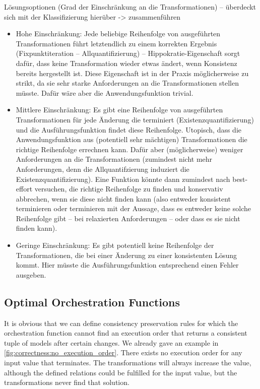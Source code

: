Lösungsoptionen (Grad der Einschränkung an die Transformationen) --  überdeckt sich mit der Klassifizierung hierüber -> zusammenführen
\begin{itemize}
    \item Hohe Einschränkung: Jede beliebige Reihenfolge von ausgeführten Transformationen führt letztendlich zu einem korrekten Ergebnis (Fixpunktiteration -- Allquantifizierung) -- Hippokratie-Eigenschaft sorgt dafür, dass keine Transformation wieder etwas ändert, wenn Konsistenz bereits hergestellt ist.
    Diese Eigenschaft ist in der Praxis möglicherweise zu strikt, da sie sehr starke Anforderungen an die Transformationen stellen müsste. Dafür wäre aber die Anwendungsfunktion trivial.
    \item Mittlere Einschränkung: Es gibt eine Reihenfolge von ausgeführten Transformationen für jede Änderung die terminiert (Existenzquantifizierung) und die Ausführungsfunktion findet diese Reihenfolge.
    Utopisch, dass die Anwendungsfunktion aus (potentiell sehr mächtigen) Transformationen die richtige Reihenfolge errechnen kann. Dafür aber (möglicherweise) weniger Anforderungen an die Transformationen (zumindest nicht mehr Anforderungen, denn die Allquantifzierung induziert die Existenzquantifizierung). Eine Funktion könnte dann zumindest nach best-effort versuchen, die richtige Reihenfolge zu finden und konservativ abbrechen, wenn sie diese nicht finden kann (also entweder konsistent terminieren oder terminieren mit der Aussage, dass es entweder keine solche Reihenfolge gibt -- bei relaxierten Anforderungen -- oder dass es sie nicht finden kann).  
    \item Geringe Einschränkung: Es gibt potentiell keine Reihenfolge der Transformationen, die bei einer Änderung zu einer konsistenten Lösung kommt. Hier müsste die Ausführungsfunktion entsprechend einen Fehler ausgeben.
\end{itemize}


\subsection{Optimal Orchestration Functions}

It is obvious that we can define consistency preservation rules for which the orchestration function cannot find an execution order that returns a consistent tuple of models after certain changes. We already gave an example in \autoref{fig:correctness:no_execution_order}. There exists no execution order for any input value that terminates. The transformations will always increase the value, although the defined relations could be fulfilled for the input value, but the transformations never find that solution.


